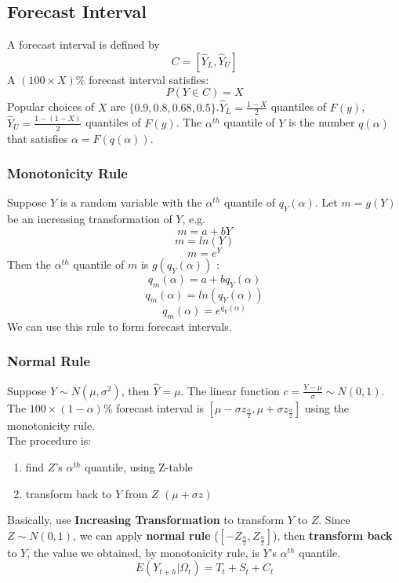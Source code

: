 \documentclass{article}
\begin{document}
\subsection{Forecast Interval}
A forecast interval is defined by 
$$C = [\hat{Y}_L, \hat{Y}_U]$$
A $(100 \times X)\%$ forecast interval satisfies:
$$P(Y \in C) = X$$
Popular choices of $X$ are $\{0.9, 0.8, 0.68, 0.5\}$.$\hat{Y}_L = \frac{1-X}{2}$ quantiles of $F(y)$, \\ 
$\hat{Y}_U = \frac{1-(1-X)}{2}$ quantiles of $F(y)$. The $\alpha^{th}$ quantile of $Y$ is the number $q(\alpha)$ that satisfies $\alpha = F(q(\alpha))$.

\subsubsection{Monotonicity Rule}
Suppose $Y$ is a random variable with the $\alpha^{th}$ quantile of $q_Y(\alpha)$. Let $m = g(Y)$ be an increasing transformation of $Y$, e.g.
$$m=a+bY$$
$$m=ln(Y)$$
$$m=e^Y$$
Then the $\alpha^{th}$ quantile of $m$ is $g(q_Y(\alpha))$ :
$$q_m(\alpha) = a + bq_Y(\alpha)$$
$$q_m(\alpha) = ln(q_Y(\alpha))$$
$$q_m(\alpha) = e^{q_Y(\alpha)}$$
We can use this rule to form forecast intervals.

\subsubsection{Normal Rule}
Suppose $Y \sim N(\mu, \sigma^2)$, then $\hat{Y} = \mu$. The linear function $c = \frac{Y - \mu}{\sigma} \sim N(0,1)$. The $100 \times (1-\alpha)\%$ forecast interval is $[\mu - \sigma z_{\frac{\alpha}{2}}, \mu + \sigma z_{\frac{\alpha}{2}}]$ using the monotonicity rule.\\
The procedure is:
\begin{enumerate}
    \item find $Z$'s $\alpha^{th}$ quantile, using Z-table
    \item transform back to $Y$ from $Z$ $(\mu + \sigma z)$
\end{enumerate}
Basically, use \textbf{Increasing Transformation} to transform $Y$ to $Z$. Since $Z \sim N(0,1)$, we can apply \textbf{normal rule} ($[-Z_{\frac{\alpha}{2}}, Z_{\frac{\alpha}{2}}]$), then \textbf{transform back} to $Y$, the value we obtained, by monotonicity rule, is $Y$'s $\alpha^{th}$ quantile.\\
$$E(Y_{t+h}|\Omega_t) = T_t + S_t + C_t$$
\end{document}
